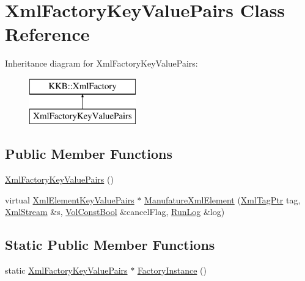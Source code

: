 \hypertarget{class_xml_factory_key_value_pairs}{}\section{Xml\+Factory\+Key\+Value\+Pairs Class Reference}
\label{class_xml_factory_key_value_pairs}
Inheritance diagram for Xml\+Factory\+Key\+Value\+Pairs\+:\begin{figure}[H]
\begin{center}
\leavevmode
\includegraphics[height=2.000000cm]{class_xml_factory_key_value_pairs}
\end{center}
\end{figure}
\subsection*{Public Member Functions}
\begin{DoxyCompactItemize}
\item 
\hyperlink{class_xml_factory_key_value_pairs_a3209b0fb88958407dd2336e7d783d519}{Xml\+Factory\+Key\+Value\+Pairs} ()
\item 
virtual \hyperlink{class_k_k_b_1_1_xml_element_key_value_pairs}{Xml\+Element\+Key\+Value\+Pairs} $\ast$ \hyperlink{class_xml_factory_key_value_pairs_af1398189a7b52c9c792132ef6c0ab221}{Manufature\+Xml\+Element} (\hyperlink{namespace_k_k_b_a9253a3ea8a5da18ca82be4ca2b390ef0}{Xml\+Tag\+Ptr} tag, \hyperlink{class_k_k_b_1_1_xml_stream}{Xml\+Stream} \&s, \hyperlink{namespace_k_k_b_a7d390f568e2831fb76b86b56c87bf92f}{Vol\+Const\+Bool} \&cancel\+Flag, \hyperlink{class_k_k_b_1_1_run_log}{Run\+Log} \&log)
\end{DoxyCompactItemize}
\subsection*{Static Public Member Functions}
\begin{DoxyCompactItemize}
\item 
static \hyperlink{class_xml_factory_key_value_pairs}{Xml\+Factory\+Key\+Value\+Pairs} $\ast$ \hyperlink{class_xml_factory_key_value_pairs_a3bc9922e3957046ac45d27e746c3e529}{Factory\+Instance} ()
\end{DoxyCompactItemize}

